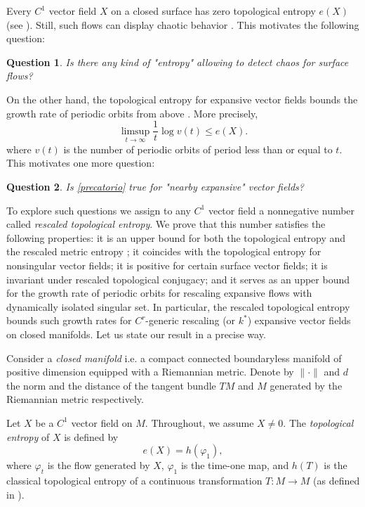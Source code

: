 \documentclass{amsart}
\newtheorem{question}{Question}
\numberwithin{equation}{section}
\begin{document}
\noindent
Every \( C^1 \) vector field $X$ on a closed surface has zero topological entropy $e(X)$ (see \cite{lg}). Still, such flows can display chaotic behavior \cite{u}.
This motivates the following question:

\begin{question}
\label{q1}
Is there any kind of "entropy" allowing to detect chaos for surface flows?
\end{question}

On the other hand, the topological entropy for expansive vector fields bounds the growth rate of periodic orbits from above \cite{bw}. More precisely,
\begin{equation}
\label{precatorio}
\limsup_{t\to\infty}\frac{1}t\log v(t)\leq e(X).
\end{equation}
where $v(t)$ is the number of periodic orbits of period less than or equal to $t$.
This motivates one more question:

\begin{question}
\label{q2}
Is \eqref{precatorio} true for "nearby expansive" vector fields?
\end{question}


To explore such questions we assign to any $C^1$ vector field a nonnegative number called {\em rescaled topological entropy}. We prove that this number satisfies the following properties: it is an upper bound for both the topological entropy and the rescaled metric entropy \cite{ww}; it coincides with the topological entropy for nonsingular vector fields; it is positive for certain surface vector fields; it is invariant under rescaled topological conjugacy; and it serves as an upper bound for the growth rate of periodic orbits for rescaling expansive flows with dynamically isolated singular set. In particular, the rescaled topological entropy bounds such growth rates for $C^r$-generic rescaling (or $k^*$) expansive vector fields on closed manifolds.
Let us state our result in a precise way.





Consider a {\em closed manifold} i.e. a compact connected boundaryless manifold of positive dimension equipped with a Riemannian metric.
Denote by $\|\cdot\|$ and $d$ the norm and the distance of the tangent bundle $TM$ and $M$ generated by the Riemannian metric respectively.

Let $X$ be a $C^1$ vector field on $M$.
Throughout, we assume \(X \neq 0\).
The {\em topological entropy} of \(X\) is defined by
\begin{equation}
\label{eqq1}
e(X)=h(\varphi_1),
\end{equation}
where \(\varphi_t\) is the flow generated by \(X\), \(\varphi_1\) is the time-one map, and \(h(T)\) is the classical topological entropy of a continuous transformation \(T:M \to M\) (as defined in \cite{akm}).
\end{document}
